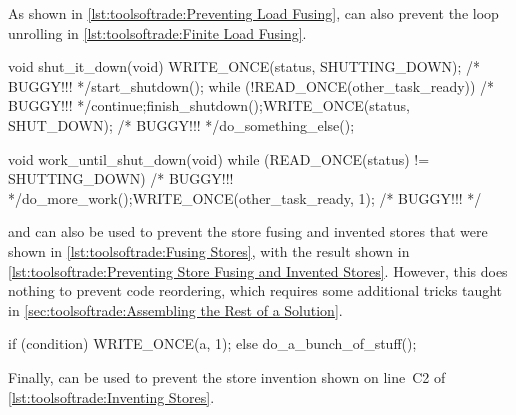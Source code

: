 As shown in
\cref{lst:toolsoftrade:Preventing Load Fusing},
 can also prevent the loop unrolling in
\cref{lst:toolsoftrade:Finite Load Fusing}.

\begin{listing}
\begin{fcvlabel}
\begin{VerbatimL}[commandchars=\\\[\]]
void shut_it_down(void)
{
	WRITE_ONCE(status, SHUTTING_DOWN); /* BUGGY!!! */\lnlbl[store:a]
	start_shutdown();
	while (!READ_ONCE(other_task_ready)) /* BUGGY!!! */\lnlbl[loop:b]
		continue;\lnlbl[loop:e]
	finish_shutdown();\lnlbl[finish]
	WRITE_ONCE(status, SHUT_DOWN); /* BUGGY!!! */\lnlbl[store:b]
	do_something_else();
}

void work_until_shut_down(void)
{
	while (READ_ONCE(status) != SHUTTING_DOWN) /* BUGGY!!! */
		do_more_work();
	WRITE_ONCE(other_task_ready, 1); /* BUGGY!!! */
}
\end{VerbatimL}
\end{fcvlabel}
\caption{Preventing Store Fusing and Invented Stores}
\label{lst:toolsoftrade:Preventing Store Fusing and Invented Stores}
\end{listing}

 and  can also be used to prevent the
store fusing and invented stores that were shown in
\cref{lst:toolsoftrade:Fusing Stores},
with the result shown in
\cref{lst:toolsoftrade:Preventing Store Fusing and Invented Stores}.
However, this does nothing to prevent code reordering, which requires
some additional tricks taught in
\cref{sec:toolsoftrade:Assembling the Rest of a Solution}.

\begin{listing}
\begin{fcvlabel}
\begin{VerbatimL}[commandchars=\\\{\}]
if (condition)
	WRITE_ONCE(a, 1);
else
	do_a_bunch_of_stuff();
\end{VerbatimL}
\end{fcvlabel}
\caption{Disinviting an Invented Store}
\label{lst:toolsoftrade:Disinviting an Invented Store}
\end{listing}

Finally,  can be used to prevent the store invention
shown on line~C2 of
\cref{lst:toolsoftrade:Inventing Stores}.

